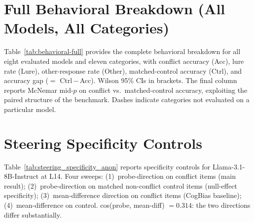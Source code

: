 \documentclass{article}
\begin{document}
\section{Full Behavioral Breakdown (All Models, All Categories)}
\label{app:full_behavior_anon}

Table~\ref{tab:behavioral-full} provides the complete behavioral
breakdown for all eight evaluated models and eleven categories, with
conflict accuracy (Acc), lure rate (Lure), other-response rate (Other),
matched-control accuracy (Ctrl), and accuracy gap ($=$ Ctrl\,$-$\,Acc).
Wilson 95\% CIs in brackets.  The final column reports McNemar mid-$p$
on conflict vs.\ matched-control accuracy, exploiting the paired
structure of the benchmark.  Dashes indicate categories not evaluated
on a particular model.



\section{Steering Specificity Controls}
\label{app:steering_specificity}

Table~\ref{tab:steering_specificity_anon} reports specificity controls
for Llama-3.1-8B-Instruct at L14.  Four sweeps: (1)~probe-direction on
conflict items (main result); (2)~probe-direction on matched non-conflict
control items (null-effect specificity); (3)~mean-difference direction
on conflict items (CogBias baseline); (4)~mean-difference on control.
cos(probe, mean-diff) $= 0.314$: the two directions differ substantially.
\end{document}
